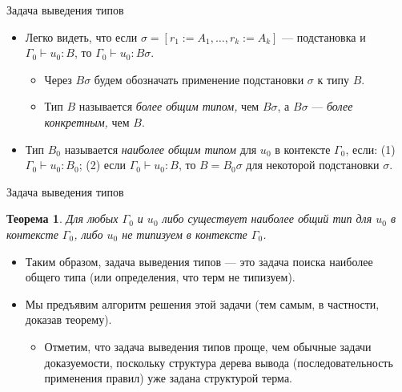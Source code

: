 \documentclass[xcolor=dvipsnames]{beamer}
\newtheorem{theoremr}{Теорема}
\begin{document}
\begin{frame}{Задача выведения типов}

\begin{itemize}[<+->]
 \item Легко видеть, что если  $\sigma = [r_1 := A_1, \ldots, r_k := A_k]$ --- подстановка и $\Gamma_0 \vdash u_0 : B$, то 
 $\Gamma_0 \vdash u_0 : B\sigma$.
 \begin{itemize}
 \item Через $B\sigma$ будем обозначать применение подстановки $\sigma$ к типу $B$.
 \item Тип $B$ называется {\em более общим типом,} чем $B\sigma$, а $B\sigma$ --- {\em более конкретным,} чем $B$.
 \end{itemize}
 \item Тип $B_0$ называется {\em наиболее общим типом} для $u_0$ в контексте $\Gamma_0$, если: (1) $\Gamma_0 \vdash u_0 : B_0$; (2) если $\Gamma_0 \vdash u_0 : B$, то $B = B_0 \sigma$ для некоторой подстановки $\sigma$.
\end{itemize}

 
\end{frame}

\begin{frame}{Задача выведения типов}

\begin{theoremr}
 Для любых $\Gamma_0$ и $u_0$ либо существует наиболее общий тип для $u_0$ в контексте $\Gamma_0$, либо $u_0$ не типизуем в контексте $\Gamma_0$.
\end{theoremr}

\begin{itemize}
 \item<2-> Таким образом, задача выведения типов --- это задача поиска наиболее общего типа (или определения, что терм не типизуем).
 \item<3-> Мы предъявим алгоритм решения этой задачи (тем самым, в частности, доказав теорему).
 \begin{itemize}
 \item<4-> Отметим, что задача выведения типов проще, чем обычные задачи доказуемости, поскольку структура дерева вывода (последовательность применения правил) уже задана структурой терма.
 \end{itemize}
\end{itemize}

 
\end{frame}
\end{document}

